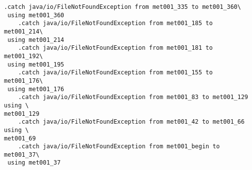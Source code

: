 
\begin{lstlisting}[caption=\EN{from some random .class file found on the author's computer}\RU{из какого-то случайного найденного на компьютере автора .class-файла}]
    .catch java/io/FileNotFoundException from met001_335 to met001_360\
 using met001_360
    .catch java/io/FileNotFoundException from met001_185 to met001_214\
 using met001_214
    .catch java/io/FileNotFoundException from met001_181 to met001_192\
 using met001_195
    .catch java/io/FileNotFoundException from met001_155 to met001_176\
 using met001_176
    .catch java/io/FileNotFoundException from met001_83 to met001_129 using \
met001_129
    .catch java/io/FileNotFoundException from met001_42 to met001_66 using \
met001_69
    .catch java/io/FileNotFoundException from met001_begin to met001_37\
 using met001_37
\end{lstlisting}
